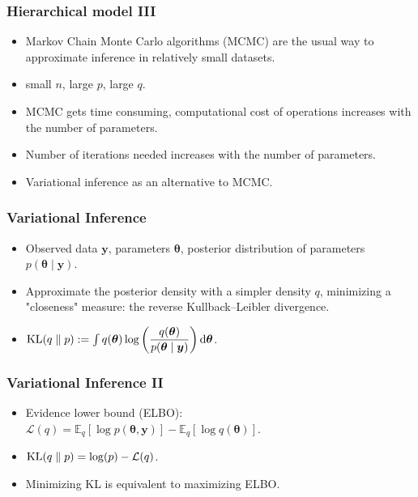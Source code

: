 \documentclass{beamer}
\DeclareMathOperator*{\KL}{{\rm KL}}
\begin{document}
\begin{frame}
\frametitle{Hierarchical model III}
\begin{itemize}
\item Markov Chain Monte Carlo algorithms (MCMC) are the usual way to approximate inference in relatively small datasets.
\item small $n$, large $p$, large $q$.
\item MCMC gets time consuming, computational cost of operations increases with the number of parameters.
\item Number of iterations needed increases with the number of parameters.
\item Variational inference as an alternative to MCMC. 
\end{itemize}
\end{frame}

\begin{frame}
\frametitle{Variational Inference}
\begin{itemize}
\item Observed data $\boldsymbol{y}$, parameters $\boldsymbol{\theta}$, posterior distribution of parameters $p(\boldsymbol{\theta} \mid \boldsymbol{y})$.
\item Approximate the posterior density with a simpler density $q$, minimizing a "closeness" measure: the reverse Kullback--Leibler divergence.
\item $\KL(q\parallel p) := \int q(\boldsymbol{\theta})\log \left(\dfrac{q(\boldsymbol{\theta})}{p(\boldsymbol{\theta} \mid \boldsymbol{y})}\right) \mathrm{d}\boldsymbol{\theta}$.
\end{itemize}
\end{frame}
\begin{frame}
\frametitle{Variational Inference II}
\begin{itemize}
\item Evidence lower bound (ELBO): $\mathcal{L}(q) = \mathbb{E}_q\left[\log p(\boldsymbol{\theta},\boldsymbol{y})\right] - \mathbb{E}_q\left[\log q(\boldsymbol{\theta})\right]$.
\item $\KL(q\parallel p) = \log(p) - \mathcal{L}(q)$.
\item Minimizing KL is equivalent to maximizing ELBO.
\end{itemize}
\end{frame}
\end{document}
